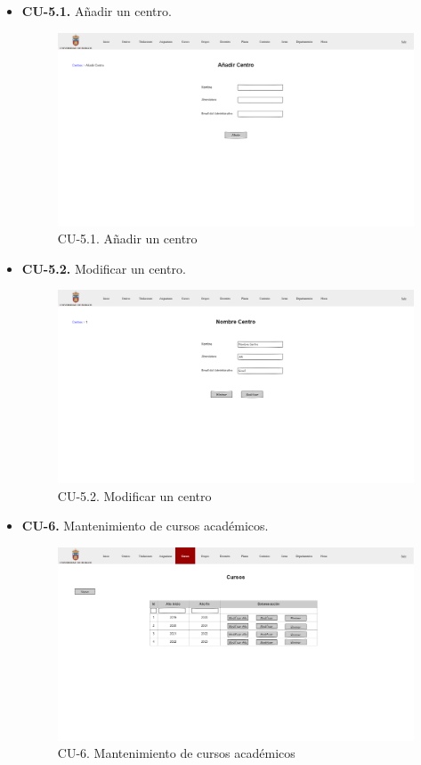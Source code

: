 \begin{itemize}
	\item \textbf{CU-5.1.} Añadir un centro.
	\begin{figure}[!h]
		\centering
		\includegraphics[width=\textwidth]{../img/Anexos/Vistas/add_centro.png}
		\caption{CU-5.1. Añadir un centro}\label{fig:../img/Anexos/Vistas/add_centro.png}
	\end{figure}
	
	\item \textbf{CU-5.2.} Modificar un centro.
	\begin{figure}[!h]
		\centering
		\includegraphics[width=\textwidth]{../img/Anexos/Vistas/mod_centro.png}
		\caption{CU-5.2. Modificar un centro}\label{fig:../img/Anexos/Vistas/mod_centro.png}
	\end{figure}
	
		\item \textbf{CU-6.} Mantenimiento de cursos académicos.
	\begin{figure}[!h]
		\centering
		\includegraphics[width=\textwidth]{../img/Anexos/Vistas/cursos.png}
		\caption{CU-6. Mantenimiento de cursos académicos}\label{fig:../img/Anexos/Vistas/cursos.png}
	\end{figure}
	

\end{itemize}
